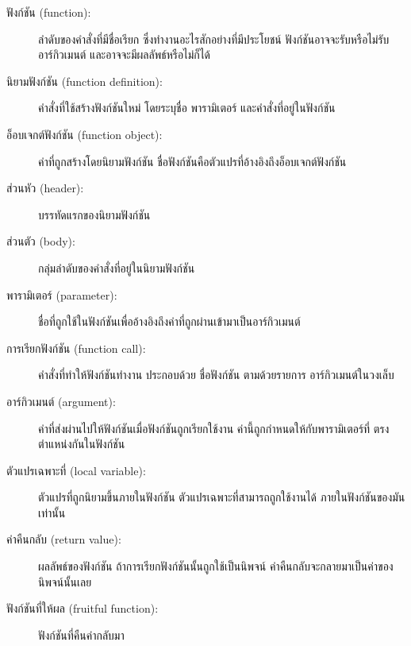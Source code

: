 \begin{description}

\item[ฟังก์ชัน (function):] ลำดับของคำสั่งที่มีชื่อเรียก ซึ่งทำงานอะไรสักอย่างที่มีประโยชน์ 
ฟังก์ชันอาจจะรับหรือไม่รับอาร์กิวเมนต์ และอาจจะมีผลลัพธ์หรือไม่ก็ได้

\item[นิยามฟังก์ชัน (function definition):] คำสั่งที่ใช้สร้างฟังก์ชันใหม่ โดยระบุชื่อ พารามิเตอร์
และคำสั่งที่อยู่ในฟังก์ชัน  

\item[อ็อบเจกต์ฟังก์ชัน (function object):] ค่าที่ถูกสร้างโดยนิยามฟังก์ชัน ชื่อฟังก์ชันคือตัวแปรที่อ้างอิงถึงอ็อบเจกต์ฟังก์ชัน 

\item[ส่วนหัว (header):] บรรทัดแรกของนิยามฟังก์ชัน

\item[ส่วนตัว (body):] กลุ่มลำดับของคำสั่งที่อยู่ในนิยามฟังก์ชัน

\item[พารามิเตอร์ (parameter):] ชื่อที่ถูกใช้ในฟังก์ชันเพื่ออ้างอิงถึงค่าที่ถูกผ่านเข้ามาเป็นอาร์กิวเมนต์

\item[การเรียกฟังก์ชัน (function call):] คำสั่งที่ทำให้ฟังก์ชันทำงาน ประกอบด้วย ชื่อฟังก์ชัน ตามด้วยรายการ
อาร์กิวเมนต์ในวงเล็บ

\item[อาร์กิวเมนต์ (argument):] ค่าที่ส่งผ่านไปให้ฟังก์ชันเมื่อฟังก์ชันถูกเรียกใช้งาน ค่านี้ถูกกำหนดให้กับพารามิเตอร์ที่
ตรงตำแหน่งกันในฟังก์ชัน 

\item[ตัวแปรเฉพาะที่ (local variable):] ตัวแปรที่ถูกนิยามขึ้นภายในฟังก์ชัน ตัวแปรเฉพาะที่สามารถถูกใช้งานได้
ภายในฟังก์ชันของมันเท่านั้น 

\item[ค่าคืนกลับ (return value):] ผลลัพธ์ของฟังก์ชัน ถ้าการเรียกฟังก์ชันนั้นถูกใช้เป็นนิพจน์
ค่าคืนกลับจะกลายมาเป็นค่าของนิพจน์นั้นเลย

\item[ฟังก์ชันที่ให้ผล (fruitful function):] ฟังก์ชันที่คืนค่ากลับมา


\end{description}

